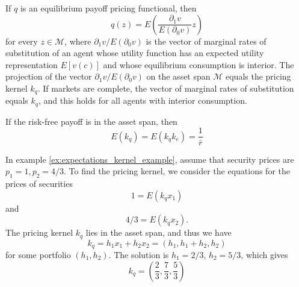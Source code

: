 \documentclass[\topdir/lecture\_notes.tex]{subfiles}
\begin{document}
If $q$ is an equilibrium payoff pricing functional, then
\begin{equation}
q(z)=E\left(\frac{\partial_{1} v}{E\left(\partial_{0} v\right)} z\right) \label{eq:marginal_rate_substitution}
\end{equation}
for every $z \in \mathcal{M}$, where $\partial_{1} v / E\left(\partial_{0} v\right)$ is the vector of marginal rates of substitution of an agent whose utility function has an expected utility representation $E[v(c)]$ and whose equilibrium consumption is interior. The projection of the vector $\partial_{1} v / E(\partial_{0} v)$ on the asset span $\mathcal{M}$ equals the pricing kernel $k_{q}$. If markets are complete, the vector of marginal rates of substitution equals $k_{q}$, and this holds for all agents with interior consumption.

If the risk-free payoff is in the asset span, then
\begin{equation*}
E(k_{q})=E(k_{q} k_{e})=\frac{1}{\bar{r}} 
\end{equation*}

\begin{example}\label{ex:pricing_kernel_example}
In example \ref{ex:expectations_kernel_example}, assume that security prices are $p_{1}=1, p_{2}=4/3$. To find the pricing kernel, we consider the equations for the prices of securities
\begin{equation*}
1=E(k_{q} x_{1}) 
\end{equation*}
and
\begin{equation*}
4 / 3=E(k_{q} x_{2}). 
\end{equation*}
The pricing kernel $k_{q}$ lies in the asset span, and thus we have
\begin{equation*}
k_{q}=h_{1} x_{1}+h_{2} x_{2}=(h_{1}, h_{1}+h_{2}, h_{2}) 
\end{equation*}
for some portfolio $(h_{1}, h_{2})$. The solution is $h_{1}=2/3$, $h_{2}=5/3$, which gives
\begin{equation*}
k_{q}=(\frac{2}{3}, \frac{7}{3}, \frac{5}{3}) 
\end{equation*}
\end{example}
\end{document}
